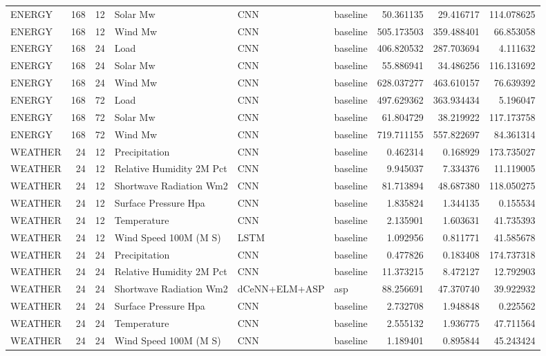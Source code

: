 \begin{table}
\begin{tabular}{lrrlllrrr}
ENERGY & 168 & 12 & Solar Mw & CNN & baseline & 50.361135 & 29.416717 & 114.078625 \\
ENERGY & 168 & 12 & Wind Mw & CNN & baseline & 505.173503 & 359.488401 & 66.853058 \\
ENERGY & 168 & 24 & Load & CNN & baseline & 406.820532 & 287.703694 & 4.111632 \\
ENERGY & 168 & 24 & Solar Mw & CNN & baseline & 55.886941 & 34.486256 & 116.131692 \\
ENERGY & 168 & 24 & Wind Mw & CNN & baseline & 628.037277 & 463.610157 & 76.639392 \\
ENERGY & 168 & 72 & Load & CNN & baseline & 497.629362 & 363.934434 & 5.196047 \\
ENERGY & 168 & 72 & Solar Mw & CNN & baseline & 61.804729 & 38.219922 & 117.173758 \\
ENERGY & 168 & 72 & Wind Mw & CNN & baseline & 719.711155 & 557.822697 & 84.361314 \\
WEATHER & 24 & 12 & Precipitation & CNN & baseline & 0.462314 & 0.168929 & 173.735027 \\
WEATHER & 24 & 12 & Relative Humidity 2M Pct & CNN & baseline & 9.945037 & 7.334376 & 11.119005 \\
WEATHER & 24 & 12 & Shortwave Radiation Wm2 & CNN & baseline & 81.713894 & 48.687380 & 118.050275 \\
WEATHER & 24 & 12 & Surface Pressure Hpa & CNN & baseline & 1.835824 & 1.344135 & 0.155534 \\
WEATHER & 24 & 12 & Temperature & CNN & baseline & 2.135901 & 1.603631 & 41.735393 \\
WEATHER & 24 & 12 & Wind Speed 100M (M S) & LSTM & baseline & 1.092956 & 0.811771 & 41.585678 \\
WEATHER & 24 & 24 & Precipitation & CNN & baseline & 0.477826 & 0.183408 & 174.737318 \\
WEATHER & 24 & 24 & Relative Humidity 2M Pct & CNN & baseline & 11.373215 & 8.472127 & 12.792903 \\
WEATHER & 24 & 24 & Shortwave Radiation Wm2 & dCeNN+ELM+ASP & asp & 88.256691 & 47.370740 & 39.922932 \\
WEATHER & 24 & 24 & Surface Pressure Hpa & CNN & baseline & 2.732708 & 1.948848 & 0.225562 \\
WEATHER & 24 & 24 & Temperature & CNN & baseline & 2.555132 & 1.936775 & 47.711564 \\
WEATHER & 24 & 24 & Wind Speed 100M (M S) & CNN & baseline & 1.189401 & 0.895844 & 45.243424 \\

\end{tabular}
\end{table}
